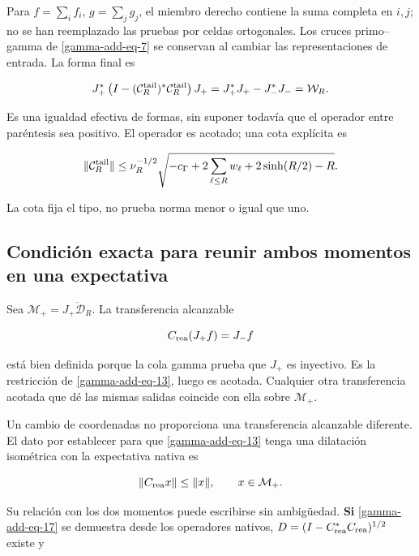Para \(f=\sum_i f_i\), \(g=\sum_j g_j\), el miembro derecho contiene la suma completa en \(i,j\); no se han reemplazado las pruebas por celdas ortogonales. Los cruces primo--gamma de \eqref{gamma-add-eq-7} se conservan al cambiar las representaciones de entrada. La forma final es

\begin{equation}
J_+^*\left(I-(\mathcal C_R^{\rm tail})^*\mathcal C_R^{\rm tail}\right)J_+
=J_+^*J_+-J_-^*J_-=\mathcal W_R.
\label{gamma-add-eq-16}
\end{equation}

Es una igualdad efectiva de formas, sin suponer todavía que el operador entre paréntesis sea positivo. El operador es acotado; una cota explícita es

\begin{equation}
\|\mathcal C_R^{\rm tail}\|
\le\nu_R^{-1/2}
\sqrt{-c_\Gamma+2\sum_{\ell\le R}w_\ell+2\sinh(R/2)-R}.
\label{gamma-add-display-33}
\end{equation}

La cota fija el tipo, no prueba norma menor o igual que uno.

\subsection{Condición exacta para reunir ambos momentos en una expectativa}
\label{gamma-add-sub-375}

Sea \(\mathcal M_+=\overline{J_+\mathcal D_R}\). La transferencia alcanzable

\begin{equation}
C_{\rm rea}(J_+f)=J_-f
\label{gamma-add-display-34}
\end{equation}

está bien definida porque la cola gamma prueba que \(J_+\) es inyectivo. Es la restricción de \eqref{gamma-add-eq-13}, luego es acotada. Cualquier otra transferencia acotada que dé las mismas salidas coincide con ella sobre \(\mathcal M_+\).

Un cambio de coordenadas no proporciona una transferencia alcanzable diferente. El dato por establecer para que \eqref{gamma-add-eq-13} tenga una dilatación isométrica con la expectativa nativa es

\begin{equation}
\|C_{\rm rea}x\|\le\|x\|,
\qquad x\in\mathcal M_+.
\label{gamma-add-eq-17}
\end{equation}

Su relación con los dos momentos puede escribirse sin ambigüedad. \textbf{Si} \eqref{gamma-add-eq-17} se demuestra desde los operadores nativos, \(D=(I-C_{\rm rea}^*C_{\rm rea})^{1/2}\) existe y

